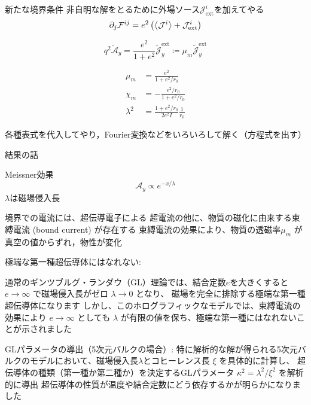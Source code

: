 \documentclass[b5paper,11pt,dvipdfmx]{jsarticle}
\numberwithin{equation}{section}
\theoremstyle{definition}
\begin{document}
新たな境界条件
非自明な解をとるために外場ソース$\mathcal{J}_{\text{ext}}^i$を加えてやる
\begin{equation}
    \partial_{j} \mathcal{F}^{ij}
    = e^{2} \left( \ev{\mathcal{J}^{i}} + \mathcal{J}_{\text{ext}}^i \right)
\end{equation}

\begin{equation}
    q^2 \tilde{\mathcal{A}}_y
    = \frac{e^2}{1 + e^2} \tilde{\mathcal{J}}^{\text{ext}}_y
    \coloneq \mu_m \tilde{\mathcal{J}}^{\text{ext}}_y
\end{equation}











\begin{equation}
    \begin{split}
            \mu_m
            &= \frac{e^2}{1 + e^2 / r_0}\\
            \chi_m
            &= - \frac{e^2 / r_0}{1 + e^2 / r_0}\\
            \lambda^2
            &= \frac{1 + e^2 / r_0}{2 e^2 I}\frac{1}{r_0}
    \end{split}
\end{equation}


















各種表式を代入してやり，Fourier変換などをいろいろして解く（方程式を出す）



結果の話

Meissner効果
\begin{equation}
    \mathcal{A}_{y}\propto e^{-x/\lambda}
\end{equation}
$\lambda$は磁場侵入長

境界での電流には、超伝導電子による
超電流の他に、物質の磁化に由来する束縛電流 (bound current) が存在する
束縛電流の効果により、物質の透磁率$\mu_m$ が真空の値からずれ，物性が変化

極端な第一種超伝導体にはなれない:

通常のギンツブルグ・ランダウ（GL）理論では、結合定数$e$を大きくすると
$e\rightarrow\infty$ で磁場侵入長がゼロ $\lambda \to 0$ となり、
磁場を完全に排除する極端な第一種超伝導体になります
しかし、このホログラフィックなモデルでは、束縛電流の効果により
$e\rightarrow\infty$ としても $\lambda$ が有限の値を保ち、極端な第一種にはなれないことが示されました

GLパラメータの導出（5次元バルクの場合）:
特に解析的な解が得られる5次元バルクのモデルにおいて、磁場侵入長$\lambda$とコヒーレンス長 $\xi$ を具体的に計算し、
超伝導体の種類（第一種か第二種か）を決定するGLパラメータ $\kappa^2 = \lambda^2 / \xi^2$ を解析的に導出
超伝導体の性質が温度や結合定数にどう依存するかが明らかになりました




\end{document}
